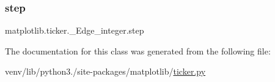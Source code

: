 \subsubsection{\texorpdfstring{step}{step}}
{\footnotesize\ttfamily matplotlib.\+ticker.\+\_\+\+Edge\+\_\+integer.\+step}



The documentation for this class was generated from the following file\+:\begin{DoxyCompactItemize}
\item 
venv/lib/python3./site-\/packages/matplotlib/\hyperlink{ticker_8py}{ticker.\+py}\end{DoxyCompactItemize}
